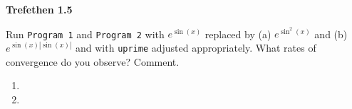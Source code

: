 \textbf{Trefethen 1.5}

Run \texttt{Program 1} and \texttt{Program 2} with $e^{\sin{(x)}}$ replaced by (a) $e^{\sin^2{(x)}}$ and (b) $e^{\sin{(x)}|\sin{(x)}|}$
and with \texttt{uprime} adjusted appropriately. What rates of convergence do you observe? Comment.

\begin{enumerate}
  \item 
  \pagebreak
  \item 
\end{enumerate}